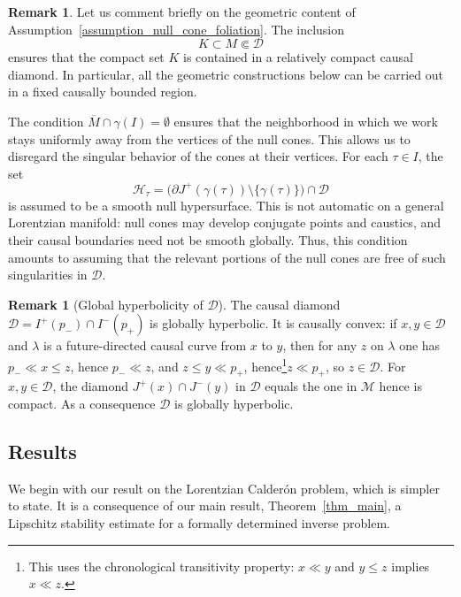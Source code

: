 \documentclass[12pt,reqno]{amsart}
\numberwithin{equation}{section}
\theoremstyle{definition}
\theoremstyle{plain}
\theoremstyle{definition}
\theoremstyle{definition}
\newtheorem{remark}[theorem]{Remark}
\newcommand{\U}{\uu}
\newcommand{\n}{\mathcal{H}}
\renewcommand{\U}{\uu}
\newcommand{\D}{\mathcal{D}}
\newcommand{\uu}{M}
\begin{document}
\begin{remark}
Let us comment briefly on the geometric content of
Assumption~\ref{assumption_null_cone_foliation}.
The inclusion
\begin{equation}
    K \subset \U \Subset \D
\end{equation}
ensures that the compact set $K$ is contained in a relatively compact
causal diamond. In particular, all the geometric constructions below
can be carried out in a fixed causally bounded region.

The condition $\overline{\U}\cap\gamma(I)=\emptyset$
ensures that the neighborhood in which we work stays uniformly away
from the vertices of the null cones. This allows us to disregard the
singular behavior of the cones at their vertices.
For each $\tau\in I$, the set
\begin{equation}
    \n_\tau
    = \bigl(\partial J^+(\gamma(\tau)) \setminus \{\gamma(\tau)\}\bigr)
  \cap \mathcal{D}
\end{equation}
is assumed to be a smooth null hypersurface. This is not automatic on a
general Lorentzian manifold: null cones may develop conjugate points
and caustics, and their causal boundaries need not be smooth globally.
Thus, this condition amounts to assuming that the relevant portions of
the null cones are free of such singularities in $\mathcal{D}$.
\end{remark}

\begin{remark}[Global hyperbolicity of $\mathcal{D}$]\label{rem_D_globhyp}
The causal diamond $\mathcal{D}=I^+(p_-)\cap I^-(p_+)$ is globally
hyperbolic. It is causally convex: if $x,y\in\mathcal{D}$ and
$\lambda$ is a future-directed causal curve from $x$ to $y$, then
for any $z$ on $\lambda$ one has $p_-\ll x\leq z$, hence $p_-\ll z$,
and $z\leq y\ll p_+$, hence\footnote{This uses the chronological transitivity property: $x \ll y$ and $y \leq z$ implies $x \ll z$.}$z\ll p_+$, so $z\in\mathcal{D}$. For $x,y\in\mathcal{D}$, the diamond $J^+(x)\cap J^-(y)$ in
$\mathcal{D}$ equals the one in $\mathcal{M}$
hence is compact. As a consequence $\mathcal{D}$ is globally hyperbolic.
\end{remark}

\subsection{Results}

We begin with our result on the Lorentzian Calder\'on problem, which is simpler to state. It is a consequence of our main result, Theorem~\ref{thm_main}, a Lipschitz stability estimate for a formally determined inverse problem.
\end{document}
